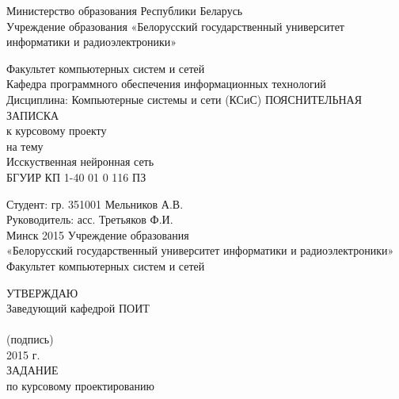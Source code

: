 \documentclass[14pt,a4paper]{extreport}
\title{}
\author{}
\begin{document}
	\center
	Министерство образования Республики Беларусь\\
	Учреждение образования «Белорусский государственный университет информатики и радиоэлектроники»
	\vspace*{2cm}
	\endcenter
	\raggedright
	Факультет компьютерных систем и сетей\\
	\medskip
	Кафедра программного обеспечения информационных технологий\\
	\medskip
	Дисциплина:  Компьютерные системы и сети (КСиС)
	\vspace*{2cm}
	\center
	ПОЯСНИТЕЛЬНАЯ ЗАПИСКА\\
	к курсовому проекту\\
	на тему\\
	\medskip
	Исскуственная нейронная сеть\\
	\medskip
	БГУИР КП  1-40 01 0 116 ПЗ
	\vspace*{4cm}
	\endcenter
	\raggedright
	\hspace*{7.94cm} Студент: гр. 351001 Мельников А.В.\\
	\bigskip
	\hspace*{7.94cm}Руководитель: асс. Третьяков Ф.И.\\
	\center
	\vspace*{6cm}
	Минск 2015
	\pagestyle{empty}
	\newpage
	\center
	Учреждение образования\\
	\medskip
	«Белорусский государственный университет информатики и радиоэлектроники»\\
	\medskip
	Факультет компьютерных систем и сетей\\
	\medskip
	\endcenter
	\raggedright
	\hspace*{9.53cm}УТВЕРЖДАЮ\\
	\hspace*{9.53cm}Заведующий кафедрой ПОИТ\\
	\hspace*{9.53cm}\underline{\hspace{6cm}} \\
	\hspace*{11cm}\small (подпись) \normalsize\\
	\hspace*{9.53cm}\underline{\hspace{5cm}}2015 г.\\
	\medskip
	\center
	ЗАДАНИЕ\\
	по курсовому проектированию\\
	\medskip
\end{document}
